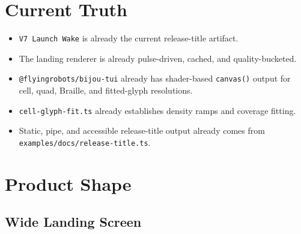 \section{Current Truth}\label{record-113-current-truth}

\begin{itemize}
\tightlist
\item
  \texttt{V\allowbreak{}7\allowbreak{} \allowbreak{}L\allowbreak{}a\allowbreak{}u\allowbreak{}n\allowbreak{}c\allowbreak{}h\allowbreak{} \allowbreak{}W\allowbreak{}a\allowbreak{}k\allowbreak{}e} is already the current release-title artifact.
\item
  The landing renderer is already pulse-driven, cached, and quality-bucketed.
\item
  \texttt{@\allowbreak{}f\allowbreak{}l\allowbreak{}y\allowbreak{}i\allowbreak{}n\allowbreak{}g\allowbreak{}r\allowbreak{}o\allowbreak{}b\allowbreak{}o\allowbreak{}t\allowbreak{}s\allowbreak{}/\allowbreak{}b\allowbreak{}i\allowbreak{}j\allowbreak{}o\allowbreak{}u\allowbreak{}-\allowbreak{}t\allowbreak{}u\allowbreak{}i} already has shader-based \texttt{c\allowbreak{}a\allowbreak{}n\allowbreak{}v\allowbreak{}a\allowbreak{}s\allowbreak{}(\allowbreak{})} output for cell, quad, Braille, and fitted-glyph resolutions.
\item
  \texttt{c\allowbreak{}e\allowbreak{}l\allowbreak{}l\allowbreak{}-\allowbreak{}g\allowbreak{}l\allowbreak{}y\allowbreak{}p\allowbreak{}h\allowbreak{}-\allowbreak{}f\allowbreak{}i\allowbreak{}t\allowbreak{}.\allowbreak{}t\allowbreak{}s} already establishes density ramps and coverage fitting.
\item
  Static, pipe, and accessible release-title output already comes from \texttt{e\allowbreak{}x\allowbreak{}a\allowbreak{}m\allowbreak{}p\allowbreak{}l\allowbreak{}e\allowbreak{}s\allowbreak{}/\allowbreak{}d\allowbreak{}o\allowbreak{}c\allowbreak{}s\allowbreak{}/\allowbreak{}r\allowbreak{}e\allowbreak{}l\allowbreak{}e\allowbreak{}a\allowbreak{}s\allowbreak{}e\allowbreak{}-\allowbreak{}t\allowbreak{}i\allowbreak{}t\allowbreak{}l\allowbreak{}e\allowbreak{}.\allowbreak{}t\allowbreak{}s}.
\end{itemize}

\section{Product Shape}\label{record-113-product-shape}

\subsection{Wide Landing Screen}\label{record-113-wide-landing-screen}

